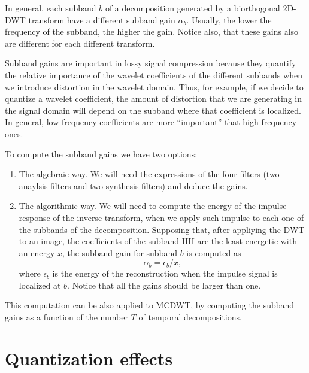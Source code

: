 In general, each subband $b$ of a decomposition generated by a
biorthogonal 2D-DWT transform have a different subband gain
$\alpha_b$. Usually, the lower the frequency of the subband, the
higher the gain. Notice also, that these gains also are different for
each different transform.

Subband gains are important in lossy signal compression because they
quantify the relative importance of the wavelet coefficients of the
different subbands when we introduce distortion in the wavelet
domain. Thus, for example, if we decide to quantize a wavelet
coefficient, the amount of distortion that we are generating in the
signal domain will depend on the subband where that coefficient is
localized. In general, low-frequency coefficients are more
``important'' that high-frequency ones.

To compute the subband gains we have two options:
\begin{enumerate}
\item The algebraic way. We will need the expressions of the four
  filters (two anaylsis filters and two synthesis filters) and deduce
  the gains.
\item The algorithmic way. We will need to compute the energy of the
  impulse response of the inverse transform, when we apply such
  impulse to each one of the subbands of the decomposition. Supposing
  that, after appliying the DWT to an image, the coefficients of the
  subband HH are the least energetic with an energy $x$, the subband
  gain for subband $b$ is computed as
  \begin{equation}
    \alpha_b = \epsilon_b/x,
  \end{equation}
  where $\epsilon_b$ is the energy of the reconstruction when the
  impulse signal is localized at $b$. Notice that all the gains should
  be larger than one.
\end{enumerate}

This computation can be also applied to MCDWT, by computing the subband
gains as a function of the number $T$ of temporal decompositions.

\section{Quantization effects}
